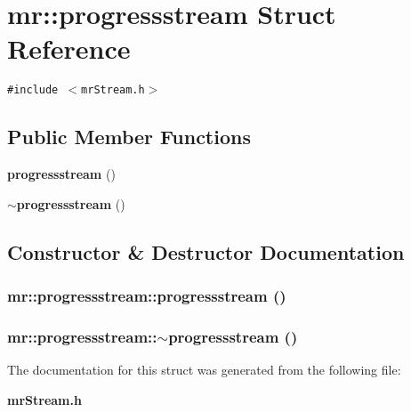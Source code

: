 \section{mr::progressstream Struct Reference}
\label{structmr_1_1progressstream}
{\tt \#include $<$mr\-Stream.h$>$}

\subsection*{Public Member Functions}
\begin{CompactItemize}
\item 
{\bf progressstream} ()
\item 
{\bf $\sim$progressstream} ()
\end{CompactItemize}


\subsection{Constructor \& Destructor Documentation}
\subsubsection{\setlength{\rightskip}{0pt plus 5cm}mr::progressstream::progressstream ()\hspace{0.3cm}{\tt  [inline]}}\label{structmr_1_1progressstream_a0}


\subsubsection{\setlength{\rightskip}{0pt plus 5cm}mr::progressstream::$\sim${\bf progressstream} ()\hspace{0.3cm}{\tt  [inline]}}\label{structmr_1_1progressstream_a1}




The documentation for this struct was generated from the following file:\begin{CompactItemize}
\item 
{\bf mr\-Stream.h}\end{CompactItemize}
